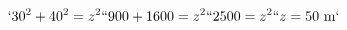 \documentclass[preview]{standalone}
\begin{document}
\begin{align*}
`30^2 + 40^2 = z^2`
`900 + 1600 = z^2`
`2500 = z^2`
`z = 50 \text{ m}`
\end{align*}
\end{document}
